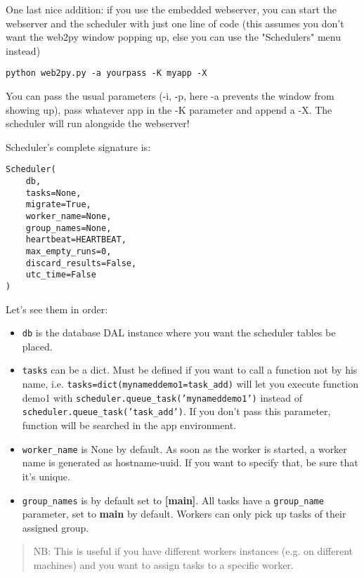 \documentclass[justified,sixbynine,notoc]{tufte-book}
\def\ft{\small\tt}
\begin{document}
\begin{fullwidth}
One last nice addition: if you use the embedded webserver, you can start the webserver and the scheduler with just one line of code (this assumes you don't want the web2py window popping up, else you can use the "Schedulers" menu instead)

\begin{lstlisting}
python web2py.py -a yourpass -K myapp -X
\end{lstlisting}
You can pass the usual parameters (-i, -p, here -a prevents the window from showing up), pass whatever app in the -K parameter and append a -X. The scheduler will run alongside the webserver!

Scheduler's complete signature is:

\begin{lstlisting}
Scheduler(
    db,
    tasks=None,
    migrate=True,
    worker_name=None,
    group_names=None,
    heartbeat=HEARTBEAT,
    max_empty_runs=0,
    discard_results=False,
    utc_time=False
)
\end{lstlisting}

Let's see them in order:

\begin{itemize}
\item {\ft db} is the database DAL instance where you want the scheduler tables be placed.

\item {\ft tasks} can be a dict. Must be defined if you want to call a function not by his name, i.e. {\ft tasks=dict(mynameddemo1=task\_add)} will let you execute function demo1 with {\ft scheduler.queue\_task('mynameddemo1')} instead of {\ft scheduler.queue\_task('task\_add')}. If you don't pass this parameter, function will be searched in the app environment.

\item {\ft worker\_name} is None by default. As soon as the worker is started, a worker name is generated as hostname-uuid. If you want to specify that, be sure that it's unique.

\item {\ft group\_names} is by default set to {\bf [main]}. All tasks have a {\ft group\_name} parameter, set to {\bf main} by default. Workers can only pick up tasks of their assigned group.
\end{itemize}

\begin{quote}NB: This is useful if you have different workers instances (e.g. on different machines) and you want to assign tasks to a specific worker.


\end{quote}
\end{fullwidth}
\end{document}
